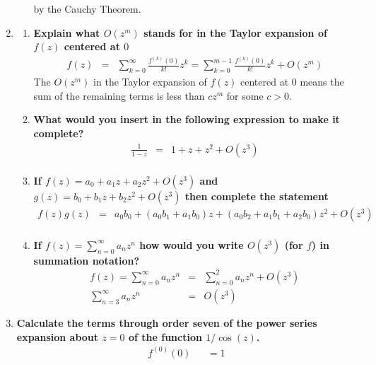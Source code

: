 \documentclass{article}%
\begin{document}
\begin{enumerate}
\begin{enumerate}[label=\alph*)]
        by the Cauchy Theorem.
    \end{enumerate}
    \item %
    \begin{enumerate}[label=\alph*)]
        \item %
        \textbf{Explain what $O(z^m)$ stands for in the Taylor expansion of $f(z)$ centered at $0$} \\
        \begin{eqnarray*}
            f(z) &=& \sum\limits_{k=0}^{\infty}\frac{f^{(k)}(0)}{k!} z^k = \sum\limits_{k=0}^{m-1}\frac{f^{(k)}(0)}{k!} z^k + O(z^m)
        \end{eqnarray*}
        The $O(z^m)$ in the Taylor expansion of $f(z)$ centered at $0$ means the sum of the remaining terms is less than $c z^m$ for some $c>0$.
        \item %
        \textbf{What would you insert in the following expression to make it complete?}
        \begin{eqnarray*}
            \frac{1}{1-z} &=& 1 + z + z^2 + O(z^3) \\
        \end{eqnarray*}
        \item %
        \textbf{If $f(z)=a_0+a_1z+a_2z^2+O(z^3)$ and $g(z)=b_0+b_1z+b_2z^2+O(z^3)$ then complete the statement}
        \begin{eqnarray*}
            f(z)g(z) &=& a_0b_0+(a_0b_1+a_1b_0)z + (a_0b_2+a_1b_1+a_2b_0)z^2 + O(z^3)\\
        \end{eqnarray*}
        \item %
        \textbf{If $f(z) = \sum\limits_{n=0}^{\infty}{a_nz^n}$ how would you write $O(z^3)$ (for $f$) in summation notation?}
        \begin{eqnarray*}
            f(z) = \sum\limits_{n=0}^{\infty}{a_nz^n} &=& \sum\limits_{n=0}^{2}{a_nz^n} + O(z^3) \\
                   \sum\limits_{n=3}^{\infty}{a_nz^n} &=& O(z^3)
        \end{eqnarray*}
    \end{enumerate}
    \item %
    \textbf{Calculate the terms through order seven of the power series expansion about $z = 0$ of the function $1/\cos(z)$.}\\
    \begin{align*}
        f^{(0)}(0) &                                                                                                                    &= 1 \\

\end{align*}
\end{enumerate}
\end{document}
